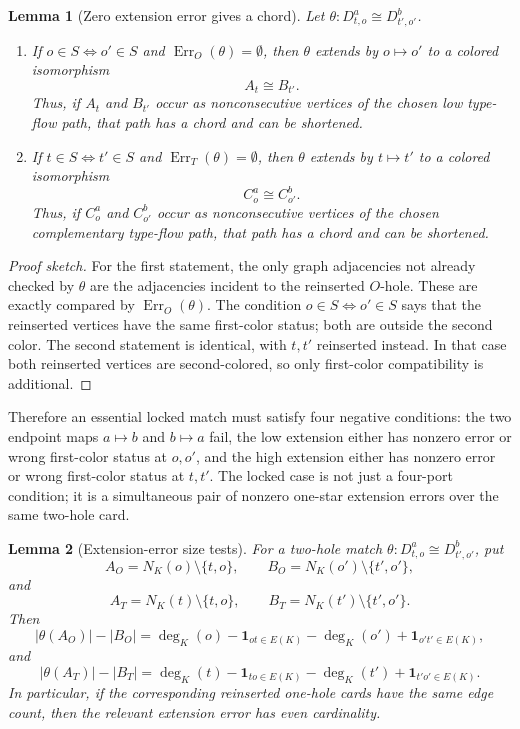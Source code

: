 \documentclass[11pt]{article}
\newtheorem{lemma}{Lemma}
\newcommand{\Err}{\operatorname{Err}}
\newcommand{\one}{\mathbf{1}}
\begin{document}
\begin{lemma}[Zero extension error gives a chord]
Let \(\theta:D_{t,o}^a\cong D_{t',o'}^b\).

\begin{enumerate}[leftmargin=2em]
  \item If \(o\in S\Longleftrightarrow o'\in S\) and
  \(\Err_O(\theta)=\emptyset\), then \(\theta\) extends by \(o\mapsto o'\)
  to a colored isomorphism
  \[
    A_t\cong B_{t'}.
  \]
  Thus, if \(A_t\) and \(B_{t'}\) occur as nonconsecutive vertices of the
  chosen low type-flow path, that path has a chord and can be shortened.

  \item If \(t\in S\Longleftrightarrow t'\in S\) and
  \(\Err_T(\theta)=\emptyset\), then \(\theta\) extends by \(t\mapsto t'\)
  to a colored isomorphism
  \[
    C_o^a\cong C_{o'}^b.
  \]
  Thus, if \(C_o^a\) and \(C_{o'}^b\) occur as nonconsecutive vertices of the
  chosen complementary type-flow path, that path has a chord and can be
  shortened.
\end{enumerate}
\end{lemma}

\begin{proof}[Proof sketch]
For the first statement, the only graph adjacencies not already checked by
\(\theta\) are the adjacencies incident to the reinserted \(O\)-hole.  These
are exactly compared by \(\Err_O(\theta)\).  The condition
\(o\in S\Longleftrightarrow o'\in S\) says that the reinserted vertices have
the same first-color status; both are outside the second color.  The second
statement is identical, with \(t,t'\) reinserted instead.  In that case both
reinserted vertices are second-colored, so only first-color compatibility is
additional.
\end{proof}

Therefore an essential locked match must satisfy four negative conditions:
the two endpoint maps \(a\mapsto b\) and \(b\mapsto a\) fail, the low
extension either has nonzero error or wrong first-color status at \(o,o'\),
and the high extension either has nonzero error or wrong first-color status
at \(t,t'\).  The locked case is not just a four-port condition; it is a
simultaneous pair of nonzero one-star extension errors over the same
two-hole card.

\begin{lemma}[Extension-error size tests]
For a two-hole match \(\theta:D_{t,o}^a\cong D_{t',o'}^b\), put
\[
  A_O=N_K(o)\setminus\{t,o\},
  \qquad
  B_O=N_K(o')\setminus\{t',o'\},
\]
and
\[
  A_T=N_K(t)\setminus\{t,o\},
  \qquad
  B_T=N_K(t')\setminus\{t',o'\}.
\]
Then
\[
  |\theta(A_O)|-|B_O|
  =
  \deg_K(o)-\one_{ot\in E(K)}
  -
  \deg_K(o')+\one_{o't'\in E(K)},
\]
and
\[
  |\theta(A_T)|-|B_T|
  =
  \deg_K(t)-\one_{to\in E(K)}
  -
  \deg_K(t')+\one_{t'o'\in E(K)}.
\]
In particular, if the corresponding reinserted one-hole cards have the same
edge count, then the relevant extension error has even cardinality.
\end{lemma}
\end{document}
